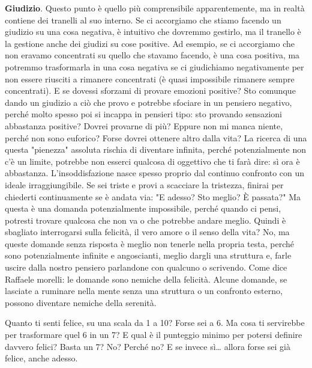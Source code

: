 \documentclass[12pt]{book} %
\begin{document}
\textbf{Giudizio}. Questo punto è quello più comprensibile apparentemente, ma in realtà contiene dei tranelli al suo interno. Se
ci accorgiamo che stiamo facendo un giudizio su una cosa negativa, è intuitivo che dovremmo gestirlo, ma il tranello è
la gestione anche dei giudizi su cose positive. Ad esempio, se ci accorgiamo che non eravamo concentrati su quello che
stavamo facendo, è una cosa positiva, ma potremmo trasformarla in una cosa negativa se ci giudichiamo negativamente per
non essere riusciti a rimanere concentrati (è quasi impossibile rimanere sempre concentrati). E se dovessi sforzami di
provare emozioni positive? Sto comunque dando un giudizio a ciò che provo e potrebbe sfociare in un pensiero negativo,
perché molto spesso poi si incappa in pensieri tipo: sto provando sensazioni abbastanza positive? Dovrei provarne di
più? Eppure non mi manca niente, perché non sono euforico? Forse dovrei ottenere altro dalla vita? La ricerca di una questa "pienezza" assoluta rischia di diventare infinita, perché potenzialmente non c'è un limite, potrebbe non esserci qualcosa di oggettivo che ti farà dire: sì ora è abbastanza. L’insoddisfazione nasce spesso proprio dal continuo confronto con un ideale irraggiungibile.
Se sei triste e provi a scacciare la tristezza, finirai per chiederti continuamente se è andata via: "E adesso? Sto meglio? È passata?" Ma questa è una domanda potenzialmente impossibile, perché quando ci pensi, potresti trovare qualcosa che non va o che potrebbe andare meglio.
Quindi è sbagliato interrogarsi sulla felicità, il vero
amore o il senso della vita? No, ma queste domande senza risposta è meglio non tenerle nella propria testa, perché sono
potenzialmente infinite e angoscianti, meglio dargli una struttura e, farle uscire dalla nostro
pensiero parlandone con qualcuno o scrivendo. 
Come dice Raffaele morelli: le domande sono nemiche della felicità.
Alcune domande, se lasciate a ruminare nella mente senza una struttura o un confronto esterno, possono diventare nemiche della serenità.

Quanto ti senti felice, su una scala da 1 a 10? Forse sei a 6. Ma cosa ti servirebbe per trasformare quel 6 in un 7?
E qual è il punteggio minimo per potersi definire davvero felici? Basta un 7? No? Perché no?
E se invece sì… allora forse sei già felice, anche adesso.
\end{document}
